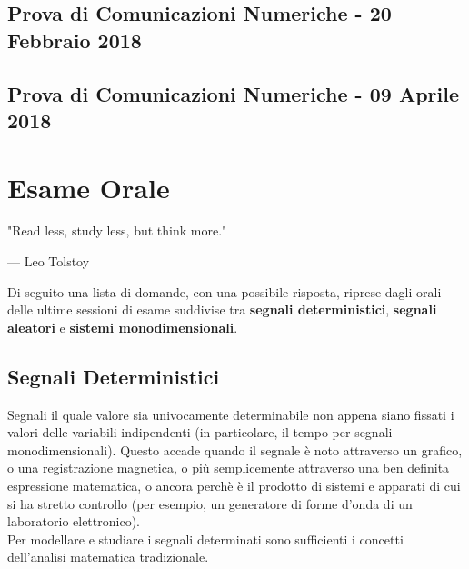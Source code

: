\documentclass[12pt,oneside,openany]{memoir}
\numberwithin{equation}{subsection}
\begin{document}
\section{Prova di Comunicazioni Numeriche - 20 Febbraio 2018}


\section{Prova di Comunicazioni Numeriche - 09 Aprile 2018}


\chapter{Esame Orale}
\epigraph{
	"Read less, study less, but think more."
}{--- \textup{Leo Tolstoy}}

Di seguito una lista di domande, con una possibile risposta, riprese dagli orali
delle ultime sessioni di esame suddivise tra \textbf{segnali deterministici},
\textbf{segnali aleatori} e \textbf{sistemi monodimensionali}.


\section{Segnali Deterministici}
Segnali il quale valore sia univocamente determinabile non appena siano fissati
i valori delle variabili indipendenti (in particolare, il tempo per segnali
monodimensionali). Questo accade quando il segnale \`e noto attraverso un
grafico, o una registrazione magnetica, o pi\`u semplicemente attraverso una ben
definita espressione matematica, o ancora perch\`e \`e il prodotto di sistemi e
apparati di cui si ha stretto controllo (per esempio, un generatore di forme
d'onda di un laboratorio elettronico).\\
Per modellare e studiare i segnali determinati sono sufficienti i concetti
dell'analisi matematica tradizionale.
\end{document}
